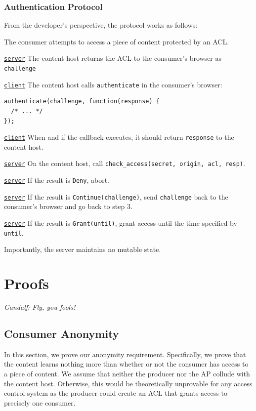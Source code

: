 \documentclass[pdftex,12pt,a4papaer,twoside,notitlepage]{report}
\begin{document}
\begin{appendices}
\subsection{Authentication Protocol}

From the developer's perspective, the protocol works as follows:

\newcommand{\server}{\underline{\texttt{server}}}
\newcommand{\client}{\underline{\texttt{client}}}

\begin{compactenum}
\item The consumer attempts to access a piece of content protected by an ACL.
\item \server{} The content host returns the ACL to the consumer's browser as
  \texttt{challenge}
\item \client{} The content host calls \texttt{authenticate} in the
  consumer's browser:
  \begin{verbatim}
authenticate(challenge, function(response) {
  /* ... */
});
\end{verbatim}
\item \client{} When and if the callback executes, it should return
  \texttt{response} to the content host.
\item \server{} On the content host, call \verb=check_access(secret, origin, acl, resp)=.
\item \server{} If the result is \texttt{Deny}, abort.
\item \server{} If the result is \texttt{Continue(challenge)}, send \texttt{challenge}
  back to the consumer's browser and go back to step 3.
\item \server{} If the result is \texttt{Grant(until)}, grant access until the
  time specified by \texttt{until}.
\end{compactenum}

Importantly, the server maintains no mutable state.

\chapter{Proofs}

\emph{Gandalf: Fly, you fools!}

\section{Consumer Anonymity}

In this section, we prove our anonymity requirement. Specifically, we prove that
the content learns nothing more than whether or not the consumer has access to a
piece of content. We assume that neither the producer nor the AP collude with
the content host. Otherwise, this would be theoretically unprovable for any
access control system as the producer could create an ACL that grants access to
precisely one consumer.


\end{appendices}
\end{document}

